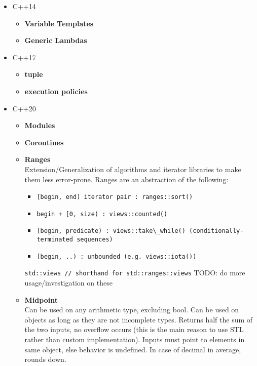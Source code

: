\documentclass{article}
\begin{document}
\begin{itemize}
\begin{itemize}
	      \end{itemize}
	\item C++14
	      \begin{itemize}
		      \item \textbf{Variable Templates}
		      \item \textbf{Generic Lambdas}
	      \end{itemize}
	\item C++17
	      \begin{itemize}
		      \item \textbf{tuple}
		      \item \textbf{execution policies}
	      \end{itemize}
	\item C++20
	      \begin{itemize}
		      \item \textbf{Modules}
		      \item \textbf{Coroutines}
		      \item \textbf{Ranges} \\
Extension/Generalization of algorithms and iterator libraries to make them less error-prone. Ranges are an abstraction of the following:
			      \begin{itemize}
			      	\item \verb![begin, end) iterator pair : ranges::sort()!
			      	\item \verb!begin + [0, size) : views::counted()!
			      	\item \verb![begin, predicate) : views::take\_while() (conditionally-terminated sequences)!
			      	\item \verb![begin, ..) : unbounded (e.g. views::iota())!
			      \end{itemize}
\verb!std::views // shorthand for std::ranges::views!
TODO: do more usage/investigation on these


		      \item \textbf{Midpoint} \\
Can be used on any arithmetic type, excluding bool. Can be used on objects as long as they are not incomplete types. Returns half the sum of the two inputs, no overflow occurs (this is the main reason to use STL rather than custom implementation). Inputs must point to elements in same object, else behavior is undefined. In case of decimal in average, rounds down.


\end{itemize}
\end{itemize}
\end{document}
